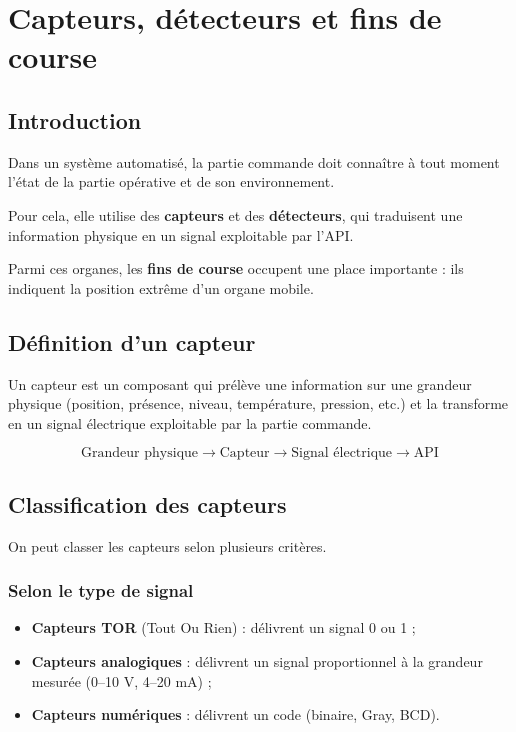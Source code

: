 \section{Capteurs, détecteurs et fins de course}

\subsection{Introduction}

Dans un système automatisé, la partie commande doit connaître à tout moment l'état de la partie opérative et de son environnement.

Pour cela, elle utilise des \textbf{capteurs} et des \textbf{détecteurs}, qui traduisent une information physique en un signal exploitable par l'API.

Parmi ces organes, les \textbf{fins de course} occupent une place importante : ils indiquent la position extrême d'un organe mobile.

\subsection{Définition d'un capteur}

Un capteur est un composant qui prélève une information sur une grandeur physique (position, présence, niveau, température, pression, etc.) et la transforme en un signal électrique exploitable par la partie commande.

\[
\text{Grandeur physique} \rightarrow \text{Capteur} \rightarrow \text{Signal électrique} \rightarrow \text{API}
\]

\subsection{Classification des capteurs}

On peut classer les capteurs selon plusieurs critères.

\subsubsection{Selon le type de signal}

\begin{itemize}
    \item \textbf{Capteurs TOR} (Tout Ou Rien) : délivrent un signal 0 ou 1 ;
    \item \textbf{Capteurs analogiques} : délivrent un signal proportionnel à la grandeur mesurée (0--10 V, 4--20 mA) ;
    \item \textbf{Capteurs numériques} : délivrent un code (binaire, Gray, BCD).
\end{itemize}

